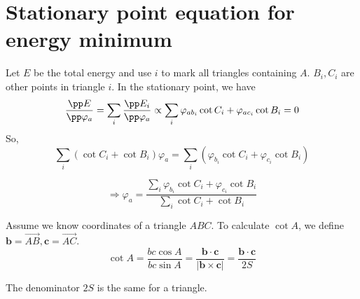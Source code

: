 \documentclass{article}
\begin{document}
\section{Stationary point equation for energy minimum}
Let $E$ be the total energy and use $i$ to mark all triangles containing $A$. $B_i, C_i$ are other points in triangle $i$. In the stationary point, we have
\[ \frac{\pp E}{\pp \varphi_a}=\sum_i\frac{\pp  E_i}{\pp \varphi_a}
 \propto\sum_i \varphi_{ab_i}\cot C_i+\varphi_{ac_i}\cot B_i=0\]
So,
\[\sum_i\left(\cot C_i+\cot B_i\right)\varphi_{a}=\sum_i\left(  \varphi_{b_i}\cot C_i+\varphi_{c_i}\cot B_i\right) \]

\[\Rightarrow\varphi_a=\frac{\sum_i \varphi_{b_i}\cot C_i+\varphi_{c_i}\cot B_i}{\sum_i\cot C_i+\cot B_i}
\]

Assume we know coordinates of a triangle $ABC$. To calculate $\cot A$, we define $\bm b=\overrightarrow{AB}, \bm c=\overrightarrow{AC}$. 
\[ \cot A=\frac{bc\cos A}{bc\sin A}=\frac{\bm{b\cdot c}}{|\bm{b\times c}|}=\frac{\bm{b\cdot c}}{2S}\]

The denominator $2S$ is the same for a triangle.
\end{document}
